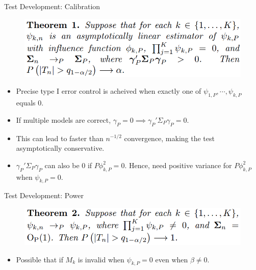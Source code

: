 \documentclass{beamer}
\begin{document}
\begin{frame}{Test Development: Calibration}
	\begin{figure}
		\center
		\includegraphics[scale=0.3]{theorem1.png}
	\end{figure}
	\vspace{1em}
	\begin{itemize}
		\item Precise type I error control is acheived when exactly one of $ \psi_{1, P}, \cdots, \psi_{k, P} $ equals $ 0 $.
		\item If multiple models are correct, $ \gamma_P = 0  \implies \gamma_P' \Sigma_P \gamma_P = 0 $.
		\item This can lead to faster than $ n^{-1/2} $ convergence, making the test asymptotically conservative.
		\item $ \gamma_P' \Sigma_P \gamma_P $ can also be $ 0 $ if $ P \phi^2_{k, P} = 0 $. Hence, need positive variance for $ P \phi^2_{k, P} $ when $ \psi_{k, P} = 0 $.
	\end{itemize}
\end{frame}

\begin{frame}{Test Development: Power}
	\begin{figure}
		\center
		\includegraphics[scale=0.3]{theorem2.png}
	\end{figure}
	\begin{itemize}
		\item Possible that if $ M_k $ is invalid when $ \psi_{k, P} = 0 $ even when $ \beta \ne 0 $.
	\end{itemize}
\end{frame}
\end{document}
